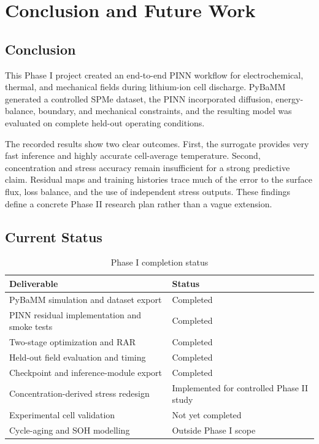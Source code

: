 \documentclass[14pt,a4paper,oneside]{extreport}
\begin{document}
\chapter{Conclusion and Future Work}
\label{chap:conclusion}
\section{Conclusion}
\label{sec:conclusion-first}
This Phase I project created an end-to-end PINN workflow for electrochemical, thermal, and mechanical fields during lithium-ion cell discharge. PyBaMM generated a controlled SPMe dataset, the PINN incorporated diffusion, energy-balance, boundary, and mechanical constraints, and the resulting model was evaluated on complete held-out operating conditions.

The recorded results show two clear outcomes. First, the surrogate provides very fast inference and highly accurate cell-average temperature. Second, concentration and stress accuracy remain insufficient for a strong predictive claim. Residual maps and training histories trace much of the error to the surface flux, loss balance, and the use of independent stress outputs. These findings define a concrete Phase II research plan rather than a vague extension.

\section{Current Status}
\begin{table}[htbp]
\centering
\caption{Phase I completion status}
\small
\begin{tabularx}{\textwidth}{p{}X}
\toprule
Deliverable & Status\\
\midrule
PyBaMM simulation and dataset export & Completed\\
PINN residual implementation and smoke tests & Completed\\
Two-stage optimization and RAR & Completed\\
Held-out field evaluation and timing & Completed\\
Checkpoint and inference-module export & Completed\\
Concentration-derived stress redesign & Implemented for controlled Phase II study\\
Experimental cell validation & Not yet completed\\
Cycle-aging and SOH modelling & Outside Phase I scope\\
\bottomrule
\end{tabularx}
\end{table}
\end{document}
